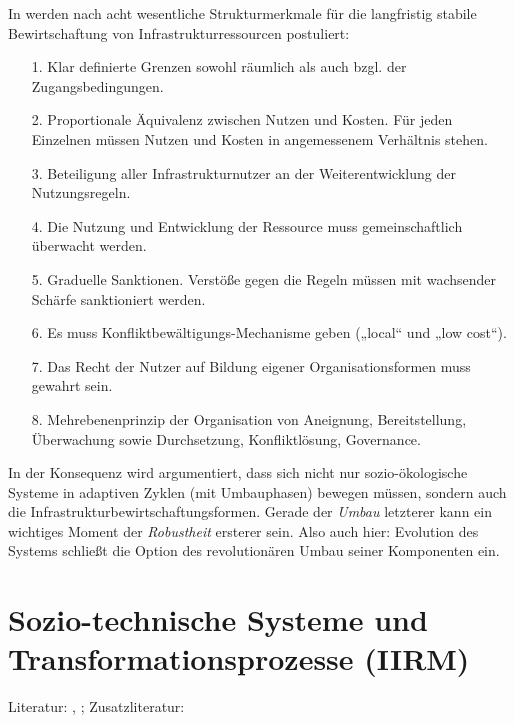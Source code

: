 \documentclass[11pt,a4paper]{article}
\begin{document}
In \cite{Anderies2004} werden nach \cite{Ostrom1990} acht wesentliche
Strukturmerkmale für die langfristig stabile Bewirtschaftung von
Infrastrukturressourcen postuliert:
\begin{itemize}[noitemsep]
\item[1.] Klar definierte Grenzen sowohl räumlich als auch bzgl. der
  Zugangsbedingungen.
\item[2.] Proportionale Äquivalenz zwischen Nutzen und Kosten. Für jeden
  Einzelnen müssen Nutzen und Kosten in angemessenem Verhältnis stehen.
\item[3.] Beteiligung aller Infrastrukturnutzer an der Weiterentwicklung der
  Nutzungsregeln.
\item[4.] Die Nutzung und Entwicklung der Ressource muss gemeinschaftlich
  überwacht werden.
\item[5.] Graduelle Sanktionen. Verstöße gegen die Regeln müssen mit
  wachsender Schärfe sanktioniert werden.
\item[6.] Es muss Konfliktbewältigungs-Mechanisme geben („local“ und „low
  cost“).
\item[7.] Das Recht der Nutzer auf Bildung eigener Organisationsformen muss
  gewahrt sein.
\item[8.] Mehrebenenprinzip der Organisation von Aneignung, Bereitstellung,
  Überwachung sowie Durchsetzung, Konfliktlösung, Governance.
\end{itemize}

In der Konsequenz wird argumentiert, dass sich nicht nur sozio-ökologische
Systeme in adaptiven Zyklen (mit Umbauphasen) bewegen müssen, sondern auch die
Infrastrukturbewirtschaftungsformen. Gerade der \emph{Umbau} letzterer kann
ein wichtiges Moment der \emph{Robustheit} ersterer sein. Also auch hier:
Evolution des Systems schließt die Option des revolutionären Umbau seiner
Komponenten ein.

\section{Sozio-technische Systeme und\\ Transformationsprozesse (IIRM)}

Literatur: \cite{Geels2007}, \cite{Foxon2009}; Zusatzliteratur:
\cite{Ropohl2009}
\end{document}
